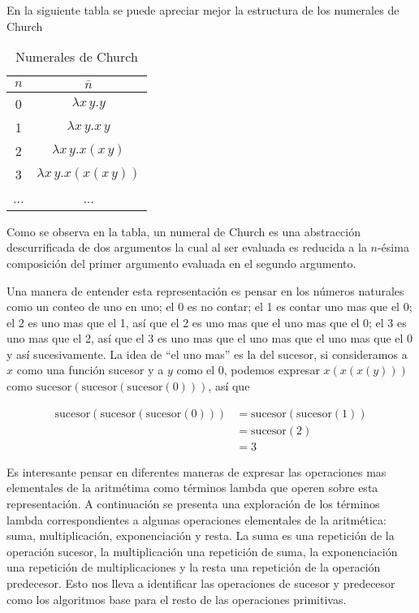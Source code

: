 En la siguiente tabla se puede apreciar mejor la estructura de los numerales de Church

\begin{table}
  \centering
  \begin{tabular}{|c|c|}
    \hline
    \( n \) & \( \bar{n} \) \\ [0.5ex]
    \hline\hline
    0 & \( λx\, y.y \) \\
    \hline
    1 & \( λx\, y.x\, y \) \\
    \hline
    2 & \( λx\, y.x(x\, y) \) \\
    \hline
    3 & \( λx\, y.x(x(x\, y)) \) \\
    \hline
    ... & ... \\
    \hline
  \end{tabular}
  \caption{Numerales de Church}
  \label{tab:numerales}
\end{table}

Como se observa en la tabla, un numeral de Church es una abstracción descurrificada de dos argumentos la cual al ser evaluada es reducida a la \( n \)-ésima composición del primer argumento evaluada en el segundo argumento.

Una manera de entender esta representación es pensar en los números naturales como un conteo de uno en uno; el 0 es no contar; el 1 es contar uno mas que el 0; el 2 es uno mas que el 1, así que el 2 es uno mas que el uno mas que el 0; el 3 es uno mas que el 2, así que el 3 es uno mas que el uno mas que el uno mas que el 0 y así sucesivamente. La idea de ``el uno mas'' es la del sucesor, si consideramos a \( x \) como una función sucesor y a \( y \) como el 0, podemos expresar \( x(x(x(y))) \) como \( \mathrm{sucesor}(\mathrm{sucesor}(\mathrm{sucesor}(0))) \), así que

\begin{align*}
\mathrm{sucesor}(\mathrm{sucesor}(\mathrm{sucesor}(0))) & = \mathrm{sucesor}(\mathrm{sucesor}(1)) \\
                             & = \mathrm{sucesor}(2) \\
                             & = 3
\end{align*}

Es interesante pensar en diferentes maneras de expresar las operaciones mas elementales de la aritmétima como términos lambda que operen sobre esta representación. A continuación se presenta una exploración de los términos lambda correspondientes a algunas operaciones elementales de la aritmética: suma, multiplicación, exponenciación y resta. La suma es una repetición de la operación sucesor, la multiplicación una repetición de suma, la exponenciación una repetición de multiplicaciones y la resta una repetición de la operación predecesor. Esto nos lleva a identificar las operaciones de sucesor y predecesor como los algoritmos base para el resto de las operaciones primitivas.


